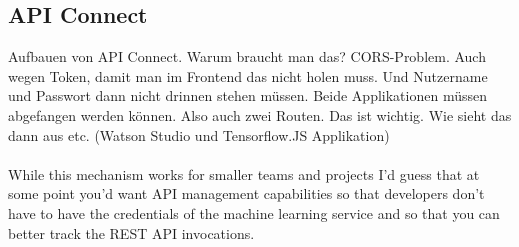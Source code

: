 \subsection{API Connect}
Aufbauen von API Connect. Warum braucht man das? CORS-Problem. Auch wegen Token, damit man im Frontend das nicht
holen muss. Und Nutzername und Passwort dann nicht drinnen stehen müssen. Beide Applikationen müssen abgefangen werden
können. Also auch zwei Routen. Das ist wichtig. Wie sieht das dann aus etc. (Watson Studio und Tensorflow.JS Applikation)
\\ \\
While this mechanism works for smaller teams and projects I’d guess that at some point you’d want API management
capabilities so that developers don’t have to have the credentials of the machine learning service and so that you can
better track the REST API invocations.